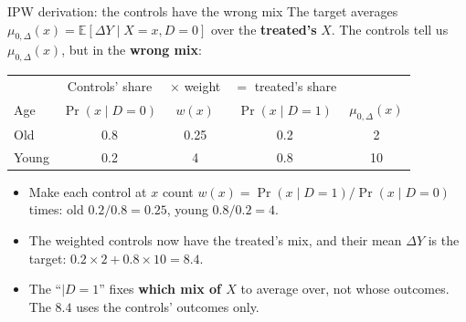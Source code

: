 \documentclass[
  11pt,
  ignorenonframetext,
  aspectratio=169,
]{beamer}
\providecommand{\tightlist}{%
  \setlength{\itemsep}{0pt}\setlength{\parskip}{0pt}}
\begin{document}
\begin{frame}{IPW derivation: the controls have the wrong mix}
\protect{}\label{ipw-derivation-the-controls-have-the-wrong-mix}
The target averages
\(\mu_{0,\Delta}(x) = \mathbb{E}[\Delta Y \mid X = x, D=0]\) over the
\textbf{treated's} \(X\). The controls tell us \(\mu_{0,\Delta}(x)\),
but in the \textbf{wrong mix}:

\begin{center}\small
\begin{tabular}{lcccc}
\toprule
 & Controls' share & $\times$ weight & $=$ treated's share & \\
Age & $\Pr(x \mid D=0)$ & $w(x)$ & $\Pr(x \mid D=1)$ & $\mu_{0,\Delta}(x)$ \\
\midrule
Old & 0.8 & 0.25 & 0.2 & 2 \\
Young & 0.2 & 4 & 0.8 & 10 \\
\bottomrule
\end{tabular}
\end{center}

\begin{itemize}
\tightlist
\item
  Make each control at \(x\) count
  \(w(x) = \Pr(x \mid D=1)/\Pr(x \mid D=0)\) times: old
  \(0.2/0.8 = 0.25\), young \(0.8/0.2 = 4\).
\item
  The weighted controls now have the treated's mix, and their mean
  \(\Delta Y\) is the target: \(0.2 \times 2 + 0.8 \times 10 = 8.4\).
\item
  The ``\(\mid D=1\)'' fixes \textbf{which mix of \(X\)} to average
  over, not whose outcomes. The \(8.4\) uses the controls' outcomes
  only.
\end{itemize}
\end{frame}
\end{document}
